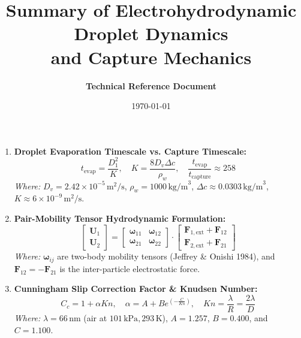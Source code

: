 \documentclass[11pt,a4paper]{article}
\title{\textbf{Summary of Electrohydrodynamic Droplet Dynamics \\ and Capture Mechanics}}
\author{\textbf{Technical Reference Document}}
\date{\today}
\begin{document}
\maketitle

\begin{enumerate}[label=\textbf{Equation \arabic* ---}, itemsep=1.5em, leftmargin=*]

  \item \textbf{Droplet Evaporation Timescale vs. Capture Timescale:}
  \begin{equation}
  t_{\text{evap}} = \frac{D_1^2}{K}, \quad K = \frac{8 D_v \Delta c}{\rho_w}, \quad \frac{t_{\text{evap}}}{t_{\text{capture}}} \approx 258
  \end{equation}
  \textit{Where:} $D_v = 2.42 \times 10^{-5} \, \text{m}^2/\text{s}$, $\rho_w = 1000 \, \text{kg/m}^3$, $\Delta c \approx 0.0303 \, \text{kg/m}^3$, $K \approx 6 \times 10^{-9} \, \text{m}^2/\text{s}$.

  \item \textbf{Pair-Mobility Tensor Hydrodynamic Formulation:}
  \begin{equation}
  \begin{bmatrix} \mathbf{U}_1 \\ \mathbf{U}_2 \end{bmatrix} = \begin{bmatrix} \boldsymbol{\omega}_{11} & \boldsymbol{\omega}_{12} \\ \boldsymbol{\omega}_{21} & \boldsymbol{\omega}_{22} \end{bmatrix} \cdot \begin{bmatrix} \mathbf{F}_{1,\text{ext}} + \mathbf{F}_{12} \\ \mathbf{F}_{2,\text{ext}} + \mathbf{F}_{21} \end{bmatrix}
  \end{equation}
  \textit{Where:} $\boldsymbol{\omega}_{ij}$ are two-body mobility tensors (Jeffrey \& Onishi 1984), and $\mathbf{F}_{12} = -\mathbf{F}_{21}$ is the inter-particle electrostatic force.

  \item \textbf{Cunningham Slip Correction Factor \& Knudsen Number:}
  \begin{equation}
  C_c = 1 + \alpha Kn, \quad \alpha = A + B e^{\left(-\frac{C}{Kn}\right)}, \quad Kn = \frac{\lambda}{R} = \frac{2\lambda}{D}
  \end{equation}
  \textit{Where:} $\lambda = 66 \, \text{nm}$ (air at $101 \, \text{kPa}, 293 \, \text{K}$), $A = 1.257$, $B = 0.400$, and $C = 1.100$.


\end{enumerate}
\end{document}
